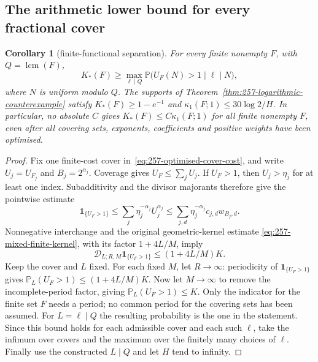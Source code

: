 \documentclass[11pt]{article}
\theoremstyle{plain}
\newtheorem{cor}[thm]{Corollary}
\theoremstyle{definition}
\theoremstyle{remark}
\begin{document}
\subsection{The arithmetic lower bound for every fractional cover}
\begin{cor}[finite-functional separation]\label{cor:257-logarithmic-separation}
For every finite nonempty $F$, with $Q=\operatorname{lcm}(F)$,
\begin{equation}
 K_*(F)\ge\max_{\ell\mid Q}
   \mathbb P\bigl(U_F(N)>1\mid\ell\mid N\bigr),
 \label{eq:257-arithmetic-cover-lower}
\end{equation}
where $N$ is uniform modulo $Q$.
The supports of Theorem~\ref{thm:257-logarithmic-counterexample} satisfy
$K_*(F)\ge1-e^{-1}$ and $\kappa_1(F;1)\le30\log2/H$.
In particular, no absolute $C$ gives $K_*(F)\le C\kappa_1(F;1)$
for all finite nonempty $F$, even after all covering sets, exponents, coefficients
and positive weights have been optimised.
\end{cor}
\begin{proof}
Fix one finite-cost cover in~\eqref{eq:257-optimised-cover-cost}, and write
$U_j=U_{F_j}$ and $B_j=2^{\alpha_j}$.
Coverage gives $U_F\le\sum_jU_j$.  If $U_F>1$, then $U_j>\eta_j$
for at least one index.  Subadditivity and the divisor majorants therefore
give the pointwise estimate
\[
 \mathbf1_{\{U_F>1\}}
 \le\sum_j\eta_j^{-\alpha_j}U_j^{\alpha_j}
 \le\sum_{j,d}\eta_j^{-\alpha_j}c_{j,d}w_{B_j,d}.
\]
Nonnegative interchange and the original geometric-kernel estimate
\eqref{eq:257-mixed-finite-kernel}, with its factor $1+4L/M$, imply
\[
 \mathscr D_{L;R,M}\mathbf1_{\{U_F>1\}}\le(1+4L/M)K.
\]
Keep the cover and $L$ fixed. For each fixed $M$, let $R\to\infty$:
periodicity of $\mathbf1_{\{U_F>1\}}$ gives
$\mathbb P_L(U_F>1)\le(1+4L/M)K$.
Now let $M\to\infty$ to remove the incomplete-period factor, giving
$\mathbb P_L(U_F>1)\le K$.
Only the indicator for the finite set $F$ needs a period; no common
period for the covering sets has been assumed.
For $L=\ell\mid Q$ the resulting probability is the one in the statement.
Since this bound holds for each admissible cover and each such $\ell$,
take the infimum over covers and the maximum over the finitely many
choices of $\ell$.  Finally use the constructed
$L\mid Q$ and let $H$ tend to infinity.
\end{proof}
\end{document}
